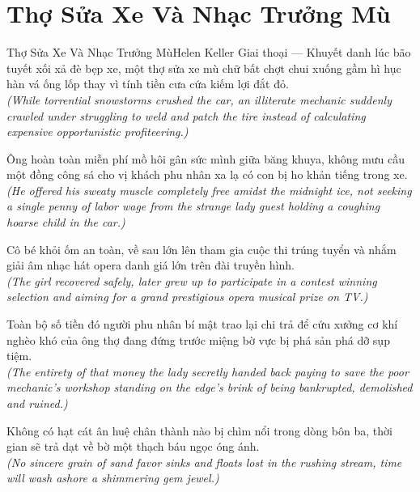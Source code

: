 \section{Thợ Sửa Xe Và Nhạc Trưởng Mù}
\begin{truyen}{Thợ Sửa Xe Và Nhạc Trưởng Mù}{Helen Keller Giai thoại --- Khuyết danh}
 lúc bão tuyết xối xả đè bẹp xe, một thợ sửa xe mù chữ bất chợt chui xuống gầm hì hục hàn vá ống lốp thay vì tính tiền cưa cứa kiếm lợi đắt đỏ.\\[4pt]
\textit{(While torrential snowstorms crushed the car, an illiterate mechanic suddenly crawled under struggling to weld and patch the tire instead of calculating expensive opportunistic profiteering.)}

Ông hoàn toàn miễn phí mồ hôi gân sức mình giữa băng khuya, không mưu cầu một đồng công sá cho vị khách phu nhân xa lạ có con bị ho khản tiếng trong xe.\\[4pt]
\textit{(He offered his sweaty muscle completely free amidst the midnight ice, not seeking a single penny of labor wage from the strange lady guest holding a coughing hoarse child in the car.)}

Cô bé khỏi ốm an toàn, về sau lớn lên tham gia cuộc thi trúng tuyển và nhắm giải âm nhạc hát opera danh giá lớn trên đài truyền hình.\\[4pt]
\textit{(The girl recovered safely, later grew up to participate in a contest winning selection and aiming for a grand prestigious opera musical prize on TV.)}

Toàn bộ số tiền đó người phu nhân bí mật trao lại chi trả để cứu xưởng cơ khí nghèo khó của ông thợ đang đứng trước miệng bờ vực bị phá sản phá dỡ sụp tiệm.\\[4pt]
\textit{(The entirety of that money the lady secretly handed back paying to save the poor mechanic's workshop standing on the edge's brink of being bankrupted, demolished and ruined.)}

\end{truyen}
\begin{baihoc}
  Không có hạt cát ân huệ chân thành nào bị chìm nổi trong dòng bôn ba, thời gian sẽ trả dạt về bờ một thạch báu ngọc óng ánh.\\[4pt]
  \textit{(No sincere grain of sand favor sinks and floats lost in the rushing stream, time will wash ashore a shimmering gem jewel.)}
\end{baihoc}

